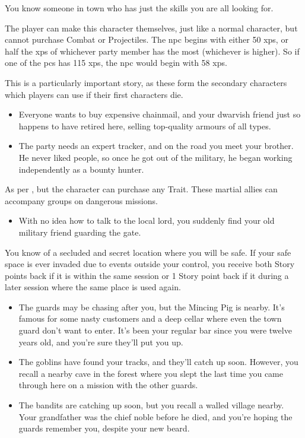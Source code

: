 \begin{multicols}{2}
\label{oldFriend}
You know someone in town who has just the skills you are all looking for.

The player can make this character themselves, just like a normal character, but cannot purchase Combat or Projectiles.
The \gls{npc} begins with either 50 \glspl{xp}, or half the \glspl{xp} of whichever party member has the most (whichever is higher).
So if one of the \glspl{pc} has 115 \glspl{xp}, the \gls{npc} would begin with 58 \glspl{xp}.

This is a particularly important story, as these form the secondary characters which players can use if their first characters die.

\begin{itemize}
\item Everyone wants to buy expensive chainmail, and your dwarvish friend just so happens to have retired here, selling top-quality armours of all types.
\item The party needs an expert tracker, and on the road you meet your brother.
He never liked people, so once he got out of the military, he began working independently as a bounty hunter.
\end{itemize}

As per , but the character can purchase any Trait.
These martial allies can accompany groups on dangerous missions.

\begin{itemize}
  \item
  With no idea how to talk to the local lord, you suddenly find your old military friend guarding the gate.
\end{itemize}

You know of a secluded and secret location where you will be safe.
If your safe space is ever invaded due to events outside your control, you receive both Story points back if it is within the same session or 1 Story point back if it during a later session where the same place is used again.

\begin{itemize}
  \item
  The guards may be chasing after you, but the Mincing Pig is nearby.  It's famous for some nasty customers and a deep cellar where even the town guard don't want to enter.
  It's been your regular bar since you were twelve years old, and you're sure they'll put you up.
  \item
  The goblins have found your tracks, and they'll catch up soon.
  However, you recall a nearby cave in the forest where you slept the last time you came through here on a mission with the other guards.
  \item
  The bandits are catching up soon, but you recall a walled village nearby.
Your grandfather was the chief noble before he died, and you're hoping the guards remember you, despite your new beard.
\end{itemize}


\end{multicols}
